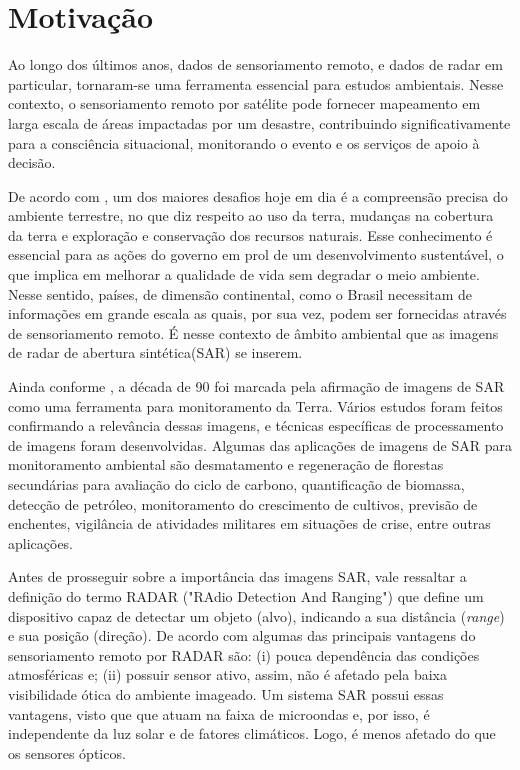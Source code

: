  

\section{Motivação}

Ao longo dos últimos anos, dados de sensoriamento remoto, e dados de radar em particular, tornaram-se uma ferramenta essencial para estudos ambientais. Nesse contexto, o sensoriamento remoto por satélite pode fornecer mapeamento em larga escala de áreas impactadas por um desastre, contribuindo significativamente para a consciência situacional, monitorando o evento e os serviços de apoio à decisão. 

De acordo com \citet{Frery99}, um dos maiores desafios hoje em dia é a compreensão precisa do ambiente terrestre, no que diz respeito ao uso da terra, mudanças na cobertura da terra e exploração e conservação dos recursos naturais. Esse conhecimento é essencial para as ações do governo em prol de um desenvolvimento sustentável, o que implica em melhorar a qualidade de vida sem degradar o meio ambiente. Nesse sentido, países, de dimensão continental, como o Brasil necessitam de informações em grande escala as quais, por sua vez, podem ser fornecidas através de sensoriamento remoto. É nesse contexto de âmbito ambiental que as imagens de radar de abertura sintética(SAR) se inserem.

Ainda conforme \citet{Freitas2005}, a década de 90 foi marcada pela afirmação de imagens de SAR como uma ferramenta para monitoramento da Terra. Vários estudos foram feitos confirmando a relevância dessas imagens, e técnicas específicas de processamento de imagens foram desenvolvidas. Algumas das aplicações de imagens de SAR para monitoramento ambiental são desmatamento e regeneração de florestas secundárias para avaliação do ciclo de carbono, quantificação de biomassa, detecção de petróleo, monitoramento do crescimento de cultivos, previsão de enchentes, vigilância de atividades militares em situações de crise, entre outras aplicações.

Antes de prosseguir sobre a importância das imagens SAR, vale ressaltar a definição do termo RADAR ("RAdio Detection And Ranging") que define um dispositivo capaz de detectar um objeto (alvo), indicando a sua distância (\textit{range}) e sua posição (direção). De acordo com \citet{Pottier2009} algumas das principais vantagens do sensoriamento remoto por RADAR são: (i) pouca dependência das condições atmosféricas e; (ii) possuir sensor ativo, assim, não é afetado pela baixa visibilidade ótica do ambiente imageado. Um sistema SAR possui essas vantagens, visto que que atuam na faixa de microondas e, por isso, é independente da luz solar e de fatores climáticos. Logo, é menos afetado do que os sensores ópticos. 


